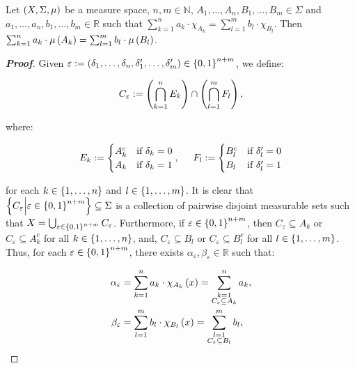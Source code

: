 \begin{proposition}
  Let $\left(X,\Sigma,\mu\right)$ be a measure space, $n,m\in\mathbb{N}$, $A_1,\dots,A_n,B_1,\dots,B_m\in\Sigma$ and $a_1,\dots,a_n,b_1,\dots,b_m\in\mathbb{R}$ such that $\sum_{k=1}^{n}{a_k\cdot\chi_{A_k}}=\sum_{l=1}^{m}{b_l\cdot\chi_{B_l}}$. Then $\sum_{k=1}^{n}{a_k\cdot\mu\left(A_k\right)}=\sum_{l=1}^{m}{b_l\cdot\mu\left(B_l\right)}$.

  \begin{proof}[\rm\textbf{Proof}]
    Given $\varepsilon:=\left(\delta_1,\dots,\delta_n,\delta'_1,\dots,\delta'_m\right)\in\left\{0,1\right\}^{n+m}$, we define:

    \begin{equation}
      C_{\varepsilon}:=\left(\bigcap_{k=1}^{n}{E_k}\right)\cap\left(\bigcap_{l=1}^{m}{F_l}\right),
    \end{equation}

    where:

    \begin{equation}
      E_k:=\begin{cases}
        A_k^c & \text{if $\delta_k=0$}\\
        A_k & \text{if $\delta_k=1$}
      \end{cases},\hspace{0.5cm}F_l:=\begin{cases}
        B_l^c & \text{if $\delta_l'=0$}\\
        B_l & \text{if $\delta_l'=1$}
      \end{cases}
    \end{equation}

    for each $k\in\left\{1,\dots,n\right\}$ and $l\in\left\{1,\dots,m\right\}$. It is clear that $\left\{C_{\varepsilon}\middle|\varepsilon\in\left\{0,1\right\}^{n+m}\right\}\subseteq\Sigma$ is a collection of pairwise disjoint measurable sets such that $X=\bigcup_{\varepsilon\in\left\{0,1\right\}^{n+m}}{C_{\varepsilon}}$. Furthermore, if $\varepsilon\in\left\{0,1\right\}^{n+m}$, then $C_{\varepsilon}\subseteq A_k$ or $C_{\varepsilon}\subseteq A_k^c$ for all $k\in\left\{1,\dots,n\right\}$, and, $C_{\varepsilon}\subseteq B_l$ or $C_{\varepsilon}\subseteq B_l^c$ for all $l\in\left\{1,\dots,m\right\}$. Thus, for each $\varepsilon\in\left\{0,1\right\}^{n+m}$, there exists $\alpha_\varepsilon,\beta_\varepsilon\in\mathbb{R}$ such that:

    \begin{equation}
      \begin{split}
        \alpha_\varepsilon & =\sum_{k=1}^{n}{a_k\cdot\chi_{A_k}\left(x\right)}=\sum_{\substack{k=1\\C_{\varepsilon}\subseteq A_k}}^{n}{a_k},\\
        \beta_\varepsilon & =\sum_{l=1}^{m}{b_l\cdot\chi_{B_l}\left(x\right)}=\sum_{\substack{l=1\\C_{\varepsilon}\subseteq B_l}}^{m}{b_l},
      \end{split}
    \end{equation}


\end{proof}
\end{proposition}
